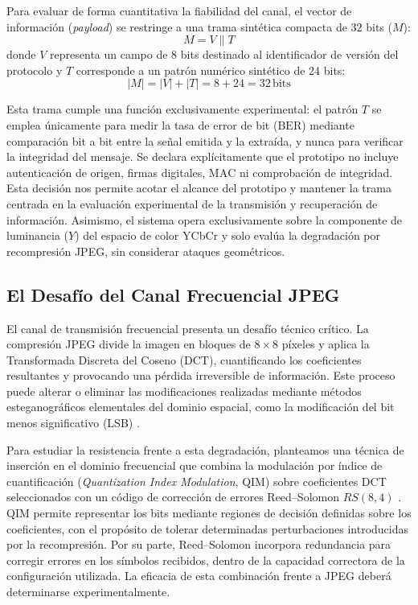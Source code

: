 \documentclass[IB]{TFUOC}%
\begin{document}
Para evaluar de forma cuantitativa la fiabilidad del canal, el vector de información (\textit{payload}) se restringe a una trama sintética compacta de 32 bits ($M$):
\begin{equation}
M = V \parallel T
\end{equation}
donde $V$ representa un campo de 8 bits destinado al identificador de versión del protocolo y $T$ corresponde a un patrón numérico sintético de 24 bits:
\begin{equation}
|M| = |V| + |T| = 8 + 24 = 32\,\text{bits}
\end{equation}

Esta trama cumple una función exclusivamente experimental: el patrón $T$ se emplea únicamente para medir la tasa de error de bit ($\mathrm{BER}$) mediante comparación bit a bit entre la señal emitida y la extraída, y nunca para verificar la integridad del mensaje. Se declara explícitamente que el prototipo no incluye autenticación de origen, firmas digitales, $\mathrm{MAC}$ ni comprobación de integridad. Esta decisión nos permite acotar el alcance del prototipo y mantener la trama centrada en la evaluación experimental de la transmisión y recuperación de información. Asimismo, el sistema opera exclusivamente sobre la componente de luminancia ($Y$) del espacio de color YCbCr y solo evalúa la degradación por recompresión JPEG, sin considerar ataques geométricos.

\subsection{El Desafío del Canal Frecuencial JPEG}
El canal de transmisión frecuencial presenta un desafío técnico crítico. La compresión JPEG divide la imagen en bloques de $8 \times 8$ píxeles y aplica la Transformada Discreta del Coseno (DCT), cuantificando los coeficientes resultantes y provocando una 
pérdida irreversible de información. Este proceso puede alterar o eliminar las modificaciones realizadas mediante métodos esteganográficos elementales del dominio espacial, como la modificación del bit menos significativo (LSB) \cite{3}.

Para estudiar la resistencia frente a esta degradación, planteamos una técnica de inserción en el dominio frecuencial que combina la modulación por índice de cuantificación (\textit{Quantization Index Modulation}, QIM)\cite{11} sobre coeficientes DCT seleccionados con un código de corrección de errores Reed--Solomon $RS(8,4)$ \cite{reed1960}. QIM permite representar los bits mediante regiones de decisión definidas sobre los coeficientes, con el propósito de tolerar determinadas perturbaciones introducidas por la recompresión. Por su parte, Reed--Solomon incorpora redundancia para corregir errores en los símbolos recibidos, dentro de la capacidad correctora de la configuración utilizada. La eficacia de esta combinación frente a JPEG deberá determinarse experimentalmente.
\end{document}
